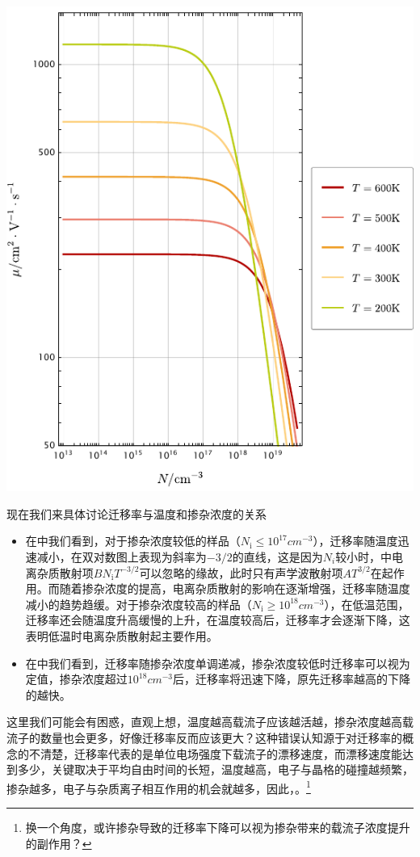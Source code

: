 \begin{Figure}[迁移率的曲线图]
\begin{FigureSub}[迁移率和掺杂浓度的关系]
        \includegraphics[scale=0.65]
        {Mathematica/output/MobilityN.pdf}
    \end{FigureSub}
\end{Figure}
现在我们来具体讨论迁移率与温度和掺杂浓度的关系
\begin{itemize}
    \item 在中我们看到，对于掺杂浓度较低的样品（$N_\text{i}\leq 10^{17}\si{cm^{-3}}$），迁移率随温度迅速减小，在双对数图上表现为斜率为$-3/2$的直线，这是因为$N_i$较小时，中电离杂质散射项$BN_\text{i}T^{-3/2}$可以忽略的缘故，此时只有声学波散射项$AT^{3/2}$在起作用。而随着掺杂浓度的提高，电离杂质散射的影响在逐渐增强，迁移率随温度减小的趋势趋缓。对于掺杂浓度较高的样品（$N_\text{i}\geq 10^{18}\si{cm^{-3}}$），在低温范围，迁移率还会随温度升高缓慢的上升，在温度较高后，迁移率才会逐渐下降，这表明低温时电离杂质散射起主要作用。
    \item 在中我们看到，迁移率随掺杂浓度单调递减，掺杂浓度较低时迁移率可以视为定值，掺杂浓度超过$10^{18}\si{cm^{-3}}$后，迁移率将迅速下降，原先迁移率越高的下降的越快。
\end{itemize}
这里我们可能会有困惑，直观上想，温度越高载流子应该越活越，掺杂浓度越高载流子的数量也会更多，好像迁移率反而应该更大？这种错误认知源于对迁移率的概念的不清楚，迁移率代表的是单位电场强度下载流子的漂移速度，而漂移速度能达到多少，关键取决于平均自由时间的长短，温度越高，电子与晶格的碰撞越频繁，掺杂越多，电子与杂质离子相互作用的机会就越多，因此，。\footnote{换一个角度，或许掺杂导致的迁移率下降可以视为掺杂带来的载流子浓度提升的副作用？}

